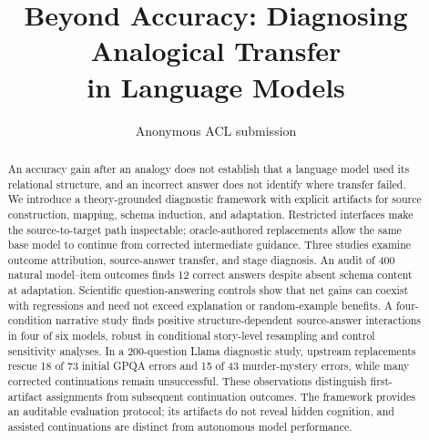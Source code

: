 \documentclass[11pt]{article}
\title{Beyond Accuracy: Diagnosing Analogical Transfer\protect\\in Language Models}
\author{Anonymous ACL submission}
\begin{document}
\maketitle
\begin{abstract}
An accuracy gain after an analogy does not establish that a language model used its relational structure, and an incorrect answer does not identify where transfer failed. We introduce a theory-grounded diagnostic framework with explicit artifacts for source construction, mapping, schema induction, and adaptation. Restricted interfaces make the source-to-target path inspectable; oracle-authored replacements allow the same base model to continue from corrected intermediate guidance. Three studies examine outcome attribution, source-answer transfer, and stage diagnosis. An audit of 400 natural model--item outcomes finds 12 correct answers despite absent schema content at adaptation. Scientific question-answering controls show that net gains can coexist with regressions and need not exceed explanation or random-example benefits. A four-condition narrative study finds positive structure-dependent source-answer interactions in four of six models, robust in conditional story-level resampling and control sensitivity analyses. In a 200-question Llama diagnostic study, upstream replacements rescue 18 of 73 initial GPQA errors and 15 of 43 murder-mystery errors, while many corrected continuations remain unsuccessful. These observations distinguish first-artifact assignments from subsequent continuation outcomes. The framework provides an auditable evaluation protocol; its artifacts do not reveal hidden cognition, and assisted continuations are distinct from autonomous model performance.
\end{abstract}







\clearpage


\appendix

\end{document}

